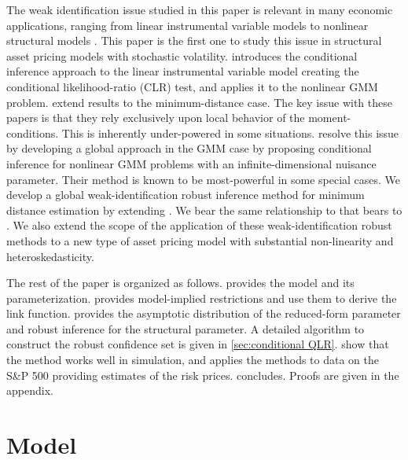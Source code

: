 The weak identification issue studied in this paper is relevant in many economic applications, ranging from linear instrumental variable models \parencite{staiger1997instrumental} to nonlinear structural models \parencites{mavroeidis2014empirical, andrews2015maximum}. This paper is the first one to study this issue in structural asset pricing models with stochastic volatility. \Textcite{moreira2003conditional} introduces the conditional inference approach to the linear instrumental variable model creating the conditional likelihood-ratio (CLR) test, and \textcite{kleibergen2005testing} applies it to the nonlinear GMM problem.  \Textcites{magnusson2010identification, magnusson2010inference} extend  results to the minimum-distance case.  The key issue with these papers is that they rely exclusively upon local behavior of the moment-conditions. This is inherently under-powered in some situations. \Textcite{andrews2016conditional} resolve this issue by developing a global approach in the GMM case by proposing conditional inference for nonlinear GMM problems with an infinite-dimensional nuisance parameter. Their method is known to be most-powerful in some special cases.  We develop a global weak-identification robust inference method for minimum distance estimation by extending \textcite{andrews2016conditional}. We bear the same relationship to  \textcites{magnusson2010identification, magnusson2010inference} that \textcite{andrews2016conditional} bears to \textcite{kleibergen2005testing}.  We also extend the scope of the application of these weak-identification robust methods to a new type of asset pricing model with substantial non-linearity and heteroskedasticity. 

The rest of the paper is organized as follows.  provides the model and its parameterization.  provides model-implied restrictions and use them to derive the link function.  provides the asymptotic distribution of the reduced-form parameter and robust inference for the structural parameter. A detailed algorithm to construct the robust confidence set is given in \cref{sec:conditional QLR}. 
 show that the method works well in simulation, and  applies the methods to data on the S\&P 500 providing estimates of the risk prices.  concludes. 
Proofs are given in the appendix.

\section{Model}\label{sec:model}

